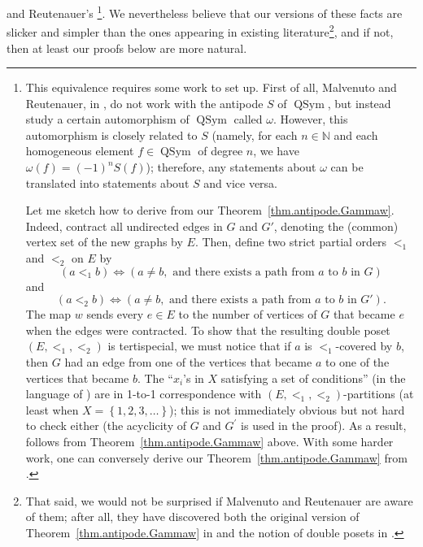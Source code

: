 \documentclass[12pt]{article}
\theoremstyle{plain}
\theoremstyle{definition}
\theoremstyle{remark}
\newcommand{\QSym}{{\operatorname{QSym}}}
\newcommand{\NN}{{\mathbb{N}}}
\begin{document}
and Reutenauer's \cite[Theorem 3.1]{Mal-Reu}\footnote{This equivalence
requires some work to set up. First of all, Malvenuto and
Reutenauer, in \cite{Mal-Reu}, do not work with the antipode $S$
of $\QSym$, but instead study a certain automorphism of
$\QSym$ called $\omega$. However, this automorphism is closely
related to $S$ (namely, for each $n \in \NN$ and each homogeneous
element $f \in \QSym$ of degree $n$, we have
$\omega\left(f\right) = \left(-1\right)^n S\left(f\right)$);
therefore, any statements about $\omega$ can be translated into
statements about $S$ and vice versa.
\par
Let me sketch how to derive \cite[Theorem 3.1]{Mal-Reu}
from our Theorem~\ref{thm.antipode.Gammaw}. Indeed, contract
all undirected edges in $G$ and $G'$,
denoting the (common) vertex set of the new graphs by $E$.
Then, define two strict partial orders $<_1$ and
$<_2$ on $E$ by
\[
\left(a <_1 b\right) \Longleftrightarrow \left(a \neq b,
\text{ and there exists a path from } a \text{ to } b \text{ in }
G \right)
\]
and
\[
\left(a <_2 b\right) \Longleftrightarrow \left(a \neq b,
\text{ and there exists a path from } a \text{ to } b \text{ in }
G' \right) .
\]
The map $w$ sends every $e \in E$ to the number of vertices
of $G$ that became $e$ when the edges were contracted. To show that
the resulting double poset $\left(E, <_1, <_2\right)$ is
tertispecial, we must notice that if $a$ is $<_1$-covered by $b$,
then $G$ had an edge from one of the vertices that became $a$ to
one of the vertices that became $b$. The ``$x_i$'s in $X$
satisfying a set of conditions'' (in the language of
\cite[Section 3]{Mal-Reu}) are in 1-to-1 correspondence with
$\left(E, <_1, <_2\right)$-partitions (at least when
$X = \left\{1, 2, 3, \ldots\right\}$); this is not immediately
obvious but not hard to check either (the acyclicity of $G$ and
$G^\prime$ is used in the proof). As a result,
\cite[Theorem 3.1]{Mal-Reu} follows from
Theorem~\ref{thm.antipode.Gammaw} above.
With some harder work, one can conversely derive
our Theorem~\ref{thm.antipode.Gammaw} from
\cite[Theorem 3.1]{Mal-Reu}.}. We
nevertheless believe that our versions of these facts are
slicker and simpler than the ones appearing in existing
literature\footnote{That said, we would not be surprised if
Malvenuto and Reutenauer are aware of them; after all, they have
discovered both the original
version of Theorem~\ref{thm.antipode.Gammaw} in
\cite{Mal-Reu} and the notion of double posets in \cite{Mal-Reu-DP}.},
and if not,
then at least our proofs below are more natural.
\end{document}
